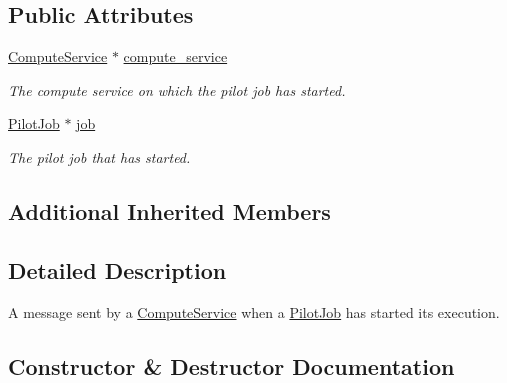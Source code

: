 \subsection*{Public Attributes}
\begin{DoxyCompactItemize}
\item 
\mbox{\label{classwrench_1_1_compute_service_pilot_job_started_message_ab2421820d0fc8ce098463f715fb362db}} 
\hyperlink{classwrench_1_1_compute_service}{Compute\+Service} $\ast$ \hyperlink{classwrench_1_1_compute_service_pilot_job_started_message_ab2421820d0fc8ce098463f715fb362db}{compute\+\_\+service}
\begin{DoxyCompactList}\small\item\em The compute service on which the pilot job has started. \end{DoxyCompactList}\item 
\mbox{\label{classwrench_1_1_compute_service_pilot_job_started_message_a2b793cf328ee0c8c19e739aab9507f83}} 
\hyperlink{classwrench_1_1_pilot_job}{Pilot\+Job} $\ast$ \hyperlink{classwrench_1_1_compute_service_pilot_job_started_message_a2b793cf328ee0c8c19e739aab9507f83}{job}
\begin{DoxyCompactList}\small\item\em The pilot job that has started. \end{DoxyCompactList}\end{DoxyCompactItemize}
\subsection*{Additional Inherited Members}


\subsection{Detailed Description}
A message sent by a \hyperlink{classwrench_1_1_compute_service}{Compute\+Service} when a \hyperlink{classwrench_1_1_pilot_job}{Pilot\+Job} has started its execution. 

\subsection{Constructor \& Destructor Documentation}
\mbox{\label{classwrench_1_1_compute_service_pilot_job_started_message_a97ab9e85523c207b9339cf7fca063b8c}} 
